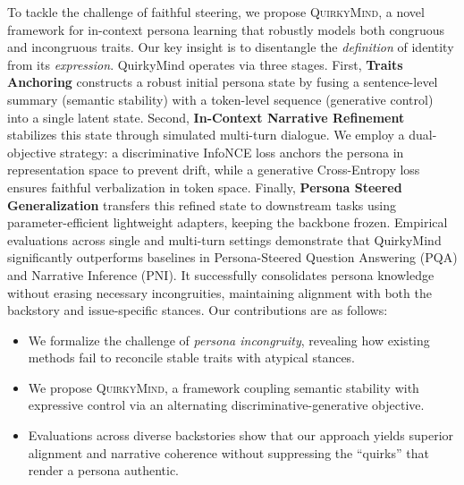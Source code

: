 To tackle the challenge of faithful steering, we propose \textsc{QuirkyMind}, a novel framework for in-context persona learning that robustly models both congruous and incongruous traits. Our key insight is to disentangle the \textit{definition} of identity from its \textit{expression}. QuirkyMind operates via three stages. First, \textbf{Traits Anchoring} constructs a robust initial persona state by fusing a sentence-level summary (semantic stability) with a token-level sequence (generative control) into a single latent state. Second, \textbf{In-Context Narrative Refinement} stabilizes this state through simulated multi-turn dialogue. We employ a dual-objective strategy: a discriminative InfoNCE loss anchors the persona in representation space to prevent drift, while a generative Cross-Entropy loss ensures faithful verbalization in token space. Finally, \textbf{Persona Steered Generalization} transfers this refined state to downstream tasks using parameter-efficient lightweight adapters, keeping the backbone frozen.
Empirical evaluations across single and multi-turn settings demonstrate that QuirkyMind significantly outperforms baselines in Persona-Steered Question Answering (PQA) and Narrative Inference (PNI). It successfully consolidates persona knowledge without erasing necessary incongruities, maintaining alignment with both the backstory and issue-specific stances.
Our contributions are as follows:
\begin{itemize}[leftmargin=1em]
    \item We formalize the challenge of \textit{persona incongruity}, revealing how existing methods fail to reconcile stable traits with atypical stances.
    \item We propose \textsc{QuirkyMind}, a framework coupling semantic stability with expressive control via an alternating discriminative-generative objective.
    \item Evaluations across diverse backstories show that our approach yields superior alignment and narrative coherence without suppressing the ``quirks'' that render a persona authentic.
\end{itemize}
